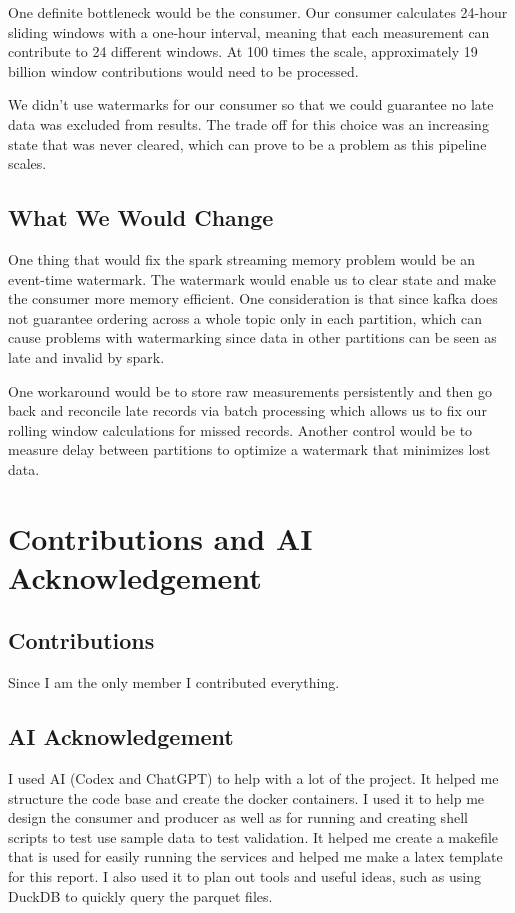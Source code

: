\documentclass[11pt,letterpaper]{article}
\begin{document}
One definite bottleneck would be the consumer. Our consumer calculates
24-hour sliding windows with a one-hour interval, meaning that
each measurement can contribute to 24 different windows. At
100 times the scale, approximately 19 billion window
contributions would need to be processed. 

We didn't use watermarks for our consumer so that we could guarantee no late data was excluded from results. The trade off for this choice was an increasing state that was never cleared, which can prove to be a problem as this pipeline scales.

\subsection{What We Would Change}
One thing that would fix the spark streaming memory problem would be an event-time watermark. The watermark would enable us to clear state and make the consumer more memory efficient. One consideration is that since kafka does not guarantee ordering across a whole topic only in each partition, which can cause problems with watermarking since data in other partitions can be seen as late and invalid by spark. 

One workaround would be to store raw measurements persistently and then go back and reconcile late records via batch processing which allows us to fix our rolling window calculations for missed records. Another control would be to measure delay between partitions to optimize a watermark that minimizes lost data. 

\section{Contributions and AI Acknowledgement}

\subsection{Contributions}
Since I am the only member I contributed everything.

\subsection{AI Acknowledgement}
I used AI (Codex and ChatGPT) to help with a lot of the project. It helped me structure the code base and create the docker containers. I used it to help me design the consumer and producer as well as for running and creating shell scripts to test use sample data to test validation. It helped me create a makefile that is used for easily running the services and helped me make a latex template for this report. I also used it to plan out tools and useful ideas, such as using DuckDB to quickly query the parquet files.
\end{document}
